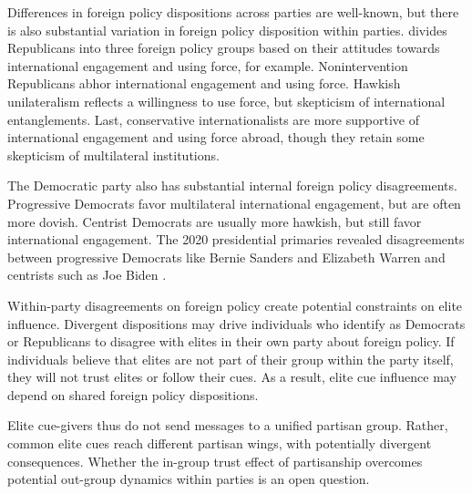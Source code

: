\documentclass[12pt]{article}
\begin{document}
Differences in foreign policy dispositions across parties are well-known, but there is also substantial variation in foreign policy disposition within parties.
\citep{Dueck2019} divides Republicans into three foreign policy groups based on their attitudes towards international engagement and using force, for example.
Nonintervention Republicans abhor international engagement and using force.
Hawkish unilateralism reflects a willingness to use force, but skepticism of international entanglements. 
Last, conservative internationalists are more supportive of international engagement and using force abroad, though they retain some skepticism of multilateral institutions.


The Democratic party also has substantial internal foreign policy disagreements. 
Progressive Democrats favor multilateral international engagement, but are often more dovish.
Centrist Democrats are usually more hawkish, but still favor international engagement. 
The 2020 presidential primaries revealed disagreements between progressive Democrats like Bernie Sanders and Elizabeth Warren and centrists such as Joe Biden \citep{Robinson2019demfp}. 




Within-party disagreements on foreign policy create potential constraints on elite influence. 
Divergent dispositions may drive individuals who identify as Democrats or Republicans to disagree with elites in their own party about foreign policy.
If individuals believe that elites are not part of their group within the party itself, they will not trust elites or follow their cues. 
As a result, elite cue influence may depend on shared foreign policy dispositions.


Elite cue-givers thus do not send messages to a unified partisan group.
Rather, common elite cues reach different partisan wings, with potentially divergent consequences. 
Whether the in-group trust effect of partisanship overcomes potential out-group dynamics within parties is an open question. 
\end{document}
